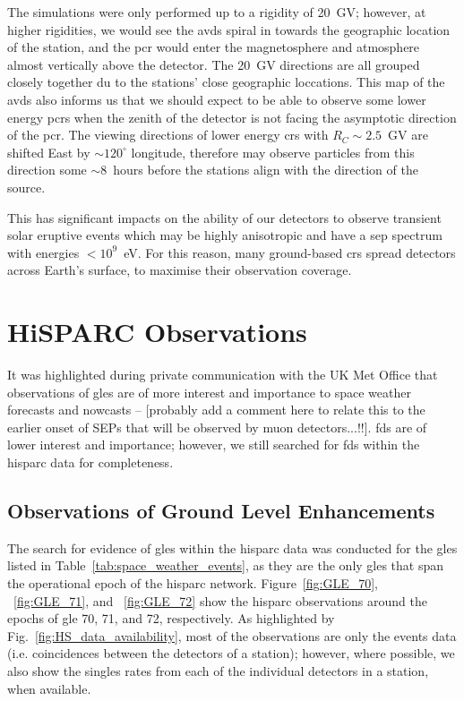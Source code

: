 The simulations were only performed up to a rigidity of 20~GV; however, at higher rigidities, we would see the \glspl{avd} spiral in towards the geographic location of the station, and the \gls{pcr} would enter the magnetosphere and atmosphere almost vertically above the detector. The 20~GV directions are all grouped closely together du to the stations' close geographic loccations. This map of the \glspl{avd} also informs us that we should expect to be able to observe some lower energy \glspl{pcr} when the zenith of the detector is not facing the asymptotic direction of the \gls{pcr}. The viewing directions of lower energy \glspl{cr} with $R_C \sim 2.5$~GV are shifted East by $\sim 120^{\circ}$ longitude, therefore may observe particles from this direction some $\sim 8$~hours before the stations align with the direction of the source.

This has significant impacts on the ability of our detectors to observe transient solar eruptive events which may be highly anisotropic and have a \gls{sep} spectrum with energies $<10^9$~eV. For this reason, many ground-based \glspl{cr} spread detectors across Earth's surface, to maximise their observation coverage.


\section{HiSPARC Observations}\label{sec:HS_obs}

It was highlighted during private communication with the UK Met Office that observations of \glspl{gle} are of more interest and importance to space weather forecasts and nowcasts -- [probably add a comment here to relate this to the earlier onset of SEPs that will be observed by muon detectors...!!]. \glspl{fd} are of lower interest and importance; however, we still searched for \glspl{fd} within the \gls{hisparc} data for completeness. 


\subsection{Observations of Ground Level Enhancements}

The search for evidence of \glspl{gle} within the \gls{hisparc} data was conducted for the \glspl{gle} listed in Table~\ref{tab:space_weather_events}, as they are the only \glspl{gle} that span the operational epoch of the \gls{hisparc} network. Figure~\ref{fig:GLE_70}, ~\ref{fig:GLE_71}, and ~\ref{fig:GLE_72} show the \gls{hisparc} observations around the epochs of \gls{gle} 70, 71, and 72, respectively. As highlighted by Fig.~\ref{fig:HS_data_availability}, most of the observations are only the events data (i.e. coincidences between the detectors of a station); however, where possible, we also show the singles rates from each of the individual detectors in a station, when available.

